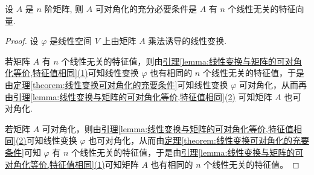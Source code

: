 \documentclass[../../main.tex]{subfiles}
\begin{document}
\begin{theorem}[矩阵可对角化的充要条件]\label{theorem:矩阵可对角化的充要条件}
设 $A$ 是 $n$ 阶矩阵, 则 $A$ 可对角化的充分必要条件是 $A$ 有 $n$ 个线性无关的特征向量.
\end{theorem}
\begin{proof}
设 $\varphi$ 是线性空间 $V$ 上由矩阵 $A$ 乘法诱导的线性变换.

若矩阵 $A$ 有 $n$ 个线性无关的特征值，则由\hyperref[lemma:线性变换与矩阵的可对角化等价,特征值相同]{引理\ref{lemma:线性变换与矩阵的可对角化等价,特征值相同}(1)}可知线性变换 $\varphi$ 也有相同的 $n$ 个线性无关的特征值，于是由\hyperref[theorem:线性变换可对角化的充要条件]{定理\ref{theorem:线性变换可对角化的充要条件}}可知线性变换 $\varphi$ 可对角化，从而再由\hyperref[lemma:线性变换与矩阵的可对角化等价,特征值相同]{引理\ref{lemma:线性变换与矩阵的可对角化等价,特征值相同}(2)} 可知矩阵 $A$ 也可对角化.

若矩阵 $A$ 可对角化，则由\hyperref[lemma:线性变换与矩阵的可对角化等价,特征值相同]{引理\ref{lemma:线性变换与矩阵的可对角化等价,特征值相同}(2)}可知线性变换 $\varphi$ 也可对角化，从而由\hyperref[theorem:线性变换可对角化的充要条件]{定理\ref{theorem:线性变换可对角化的充要条件}}可知 $\varphi$ 有 $n$ 个线性无关的特征值，于是由\hyperref[lemma:线性变换与矩阵的可对角化等价,特征值相同]{引理\ref{lemma:线性变换与矩阵的可对角化等价,特征值相同}(1)}可知矩阵 $A$ 也有相同的 $n$ 个线性无关的特征值。
\end{proof}
\end{document}

